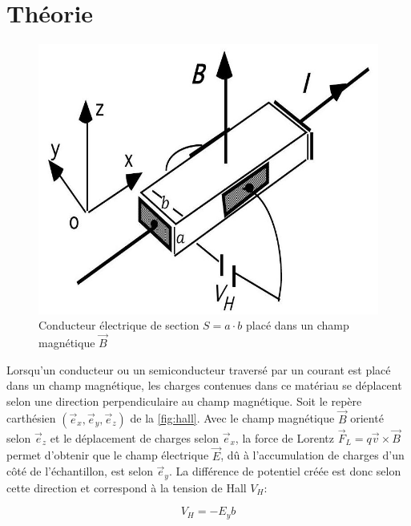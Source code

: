 \section{Théorie}

\begin{minipage}{\textwidth}
    \begin{figure}
        \centering
        \includegraphics[width=\linewidth]{figures/hall.png}
        \caption{Conducteur électrique de section \(S = a \cdot b\) placé dans un champ magnétique \(\vec{B}\) \cite{notice}}
        \label{fig:hall}
        \vspace*{1cm}
    \end{figure}

    Lorsqu'un conducteur ou un semiconducteur traversé par un courant est placé dans un champ magnétique, les charges contenues dans ce matériau se déplacent selon une direction perpendiculaire au champ magnétique. Soit le repère carthésien \((\vec{e}_x,\vec{e}_y,\vec{e}_z)\) de la \autoref{fig:hall}. Avec le champ magnétique \(\vec{B}\) orienté selon \(\vec{e}_z\) et le déplacement de charges selon \(\vec{e}_x\), la force de Lorentz \(\vec{F}_L = q\vec{v} \times \vec{B}\) permet d'obtenir que le champ électrique \(\vec{E}\), dû à l'accumulation de charges d'un côté de l'échantillon, est selon \(\vec{e}_y\). La différence de potentiel créée est donc selon cette direction et correspond à la tension de Hall \(V_H\):

    \begin{equation}
        V_H = -E_yb
        \label{eq:physique}
    \end{equation}


\end{minipage}
